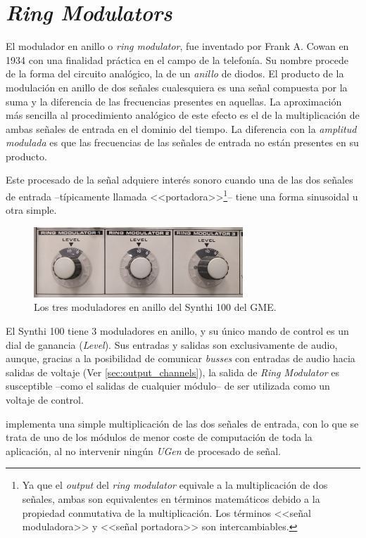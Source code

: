 \section[Output Channels]{\textit{Ring Modulators}}
\label{sec:ring_modulators}

El modulador en anillo o \textit{ring modulator}, fue inventado por Frank A. Cowan en 1934 con una finalidad práctica en el campo de la telefonía. Su nombre procede de la forma del circuito analógico, la de un \textit{anillo} de diodos. El producto de la modulación en anillo de dos señales cualesquiera es una señal compuesta por la suma y la diferencia de las frecuencias presentes en aquellas. La aproximación más sencilla al procedimiento analógico de este efecto es el de la multiplicación de ambas señales de entrada en el dominio del tiempo. La diferencia con la \textit{amplitud modulada} es que las frecuencias de las señales de entrada no están presentes en su producto. 

Este procesado de la señal adquiere interés sonoro cuando una de las dos señales de entrada --típicamente llamada <<portadora>>\footnote{Ya que el \textit{output} del \textit{ring modulator} equivale a la multiplicación de dos señales, ambas son equivalentes en términos matemáticos debido a la propiedad conmutativa de la multiplicación. Los términos <<señal moduladora>> y <<señal portadora>> son intercambiables.}-- tiene una forma sinusoidal u otra simple. 

\begin{figure}
	\centering
	\includegraphics[width=0.7\textwidth]{images/ring_modulators}
	\caption[\textit{Ring Modulators}]{Los tres moduladores en anillo del Synthi 100 del GME.}
	\label{fig:ring_modulators}
\end{figure}

El Synthi 100 tiene 3 moduladores en anillo, y su único mando de control es un dial de ganancia (\textit{Level}). Sus entradas y salidas son exclusivamente de audio, aunque, gracias a la posibilidad de comunicar \textit{busses} con entradas de audio hacia salidas de voltaje (Ver \ref{sec:output_channels}), la salida de \textit{Ring Modulator} es susceptible --como el salidas de cualquier módulo-- de ser utilizada como un voltaje de control.

\appName implementa una simple multiplicación de las dos señales de entrada, con lo que se trata de uno de los módulos de menor coste de computación de toda la aplicación, al no intervenir ningún \textit{UGen} de procesado de señal.